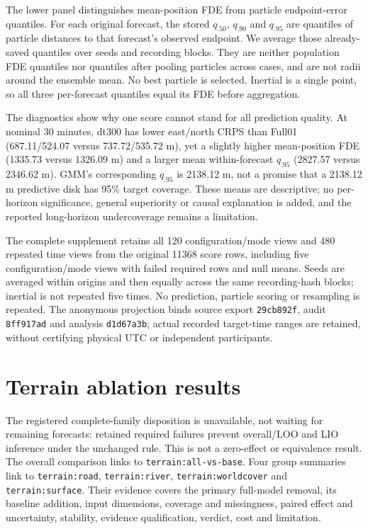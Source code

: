 \documentclass[11pt]{article}
\begin{document}
The lower panel distinguishes mean-position FDE from particle endpoint-error
quantiles. For each original forecast, the stored $q_{.50}$, $q_{.90}$ and
$q_{.95}$ are quantiles of particle distances to that forecast's observed
endpoint. We average those already-saved quantiles over seeds and recording
blocks. They are neither population FDE quantiles nor quantiles after pooling
particles across cases, and are not radii around the ensemble mean. No best
particle is selected. Inertial is a single point, so all three per-forecast
quantiles equal its FDE before aggregation.

The diagnostics show why one score cannot stand for all prediction quality.
At nominal 30 minutes, dt300 has lower east/north CRPS than Full01
(687.11/524.07 versus 737.72/535.72 m), yet a slightly higher mean-position
FDE (1335.73 versus 1326.09 m) and a larger mean within-forecast $q_{.95}$
(2827.57 versus 2346.62 m). GMM's corresponding $q_{.95}$ is 2138.12 m,
not a promise that a 2138.12 m predictive disk has 95\% target coverage.
These means are descriptive; no per-horizon significance, general superiority
or causal explanation is added, and the reported long-horizon undercoverage
remains a limitation.

The complete  supplement retains all
120 configuration/mode views and 480 repeated time views from the original
11368 score rows, including five configuration/mode views with failed required
rows and null means. Seeds are averaged within origins and then equally
across the same recording-hash blocks; inertial is not repeated five times.
No prediction, particle scoring or resampling is repeated. The anonymous
projection binds source export \texttt{29cb892f}, audit \texttt{8ff917ad} and
analysis \texttt{d1d67a3b}; actual recorded target-time ranges are retained,
without certifying physical UTC or independent participants.


\section{Terrain ablation results}
\label{sec:terrain-results}
The registered complete-family disposition is unavailable, not waiting for
remaining forecasts: retained required failures prevent overall/LOO and LIO
inference under the unchanged rule. This is not a zero-effect or equivalence
result. The overall comparison links to \texttt{terrain:all-vs-base}.
Four group summaries link to \texttt{terrain:road}, \texttt{terrain:river},
\texttt{terrain:worldcover} and \texttt{terrain:surface}. Their evidence covers
the primary full-model removal, its baseline addition, input dimensions,
coverage and missingness, paired effect and uncertainty, stability, evidence
qualification, verdict, cost and limitation.
\end{document}
